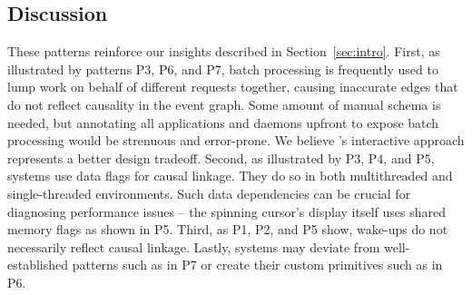 \subsection{Discussion}

These patterns reinforce our insights described in
Section~\ref{sec:intro}.  First, as illustrated by patterns P3, P6, and
P7, batch processing is frequently used to lump work on behalf of
different requests together, causing inaccurate edges that do not reflect
causality in the event graph.  Some amount of manual schema is needed, but
annotating all applications and daemons upfront to expose batch processing
would be strenuous and error-prone.  We believe \xxx's interactive
approach represents a better design tradeoff.  Second, as illustrated by
P3, P4, and P5, systems use data flags for causal linkage.  They do so in
both multithreaded and single-threaded environments.  Such data
dependencies can be crucial for diagnosing performance issues -- the
spinning cursor's display itself uses shared memory flags as shown in P5.
Third, as P1, P2, and P5 show, wake-ups do not necessarily reflect causal
linkage.  Lastly, systems may deviate from well-established patterns such
as in P7 or create their custom primitives such as in P6.
